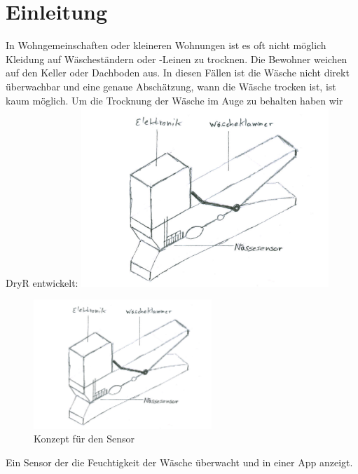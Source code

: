 \section{Einleitung}
	In Wohngemeinschaften oder kleineren Wohnungen ist es oft nicht möglich Kleidung auf Wäscheständern oder -Leinen zu trocknen. Die Bewohner weichen auf den Keller oder Dachboden aus. In diesen Fällen ist die Wäsche nicht direkt überwachbar und eine genaue Abschätzung, wann die Wäsche trocken ist, ist kaum möglich.
Um die Trocknung der Wäsche im Auge zu behalten haben wir DryR entwickelt:
\includegraphics[width=0.7\textwidth]{01-klammer.png}
			\begin{figure}[htb] 
				\centerline{\includegraphics[width=0.6\textwidth]{01-klammer.png}}
				\caption{Konzept für den Sensor}
				\label{einleitung_klammer}
			\end{figure}
Ein Sensor der die Feuchtigkeit der Wäsche überwacht und in einer App anzeigt.
